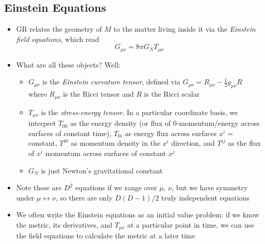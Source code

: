 \documentclass[12pt,a4paper]{article}
\numberwithin{equation}{section}
\begin{document}
	\subsection{Einstein Equations}
	\begin{itemize}
		\item GR relates the geometry of $M$ to the matter living inside it via the \textit{Einstein field equations}, which read
		\begin{equation}
			G_{\mu\nu}=8\pi G_{N}T_{\mu\nu}
		\end{equation}
		\item What are all these objects? Well:
		\begin{itemize}
			\item $G_{\mu\nu}$ is the \textit{Einstein curvature tensor}, defined via $G_{\mu\nu}=R_{\mu\nu}-\frac{1}{2}g_{\mu\nu}R$ where $R_{\mu\nu}$ is the Ricci tensor and $R$ is the Ricci scalar
			\item $T_{\mu\nu}$ is the \textit{stress-energy tensor}. In a particular coordinate basis, we interpret $T_{00}$ as the energy density (or flux of 0-momentum/energy across surfaces of constant time), $T_{0i}$ as energy flux across surfaces $x^{i}=$ constant, $T^{i0}$ as momentum density in the $x^{i}$ direction, and $T^{ij}$ as the flux of $x^{i}$ momentum across surfaces of constant $x^{j}$
			\item $G_{N}$ is just Newton's gravitational constant
		\end{itemize}
		\item Note these are $D^{2}$ equations if we range over $\mu,\,\nu$, but we have symmetry under $\mu\leftrightarrow\nu$, so there are only $D(D-1)/2$ truly independent equations
		\item We often write the Einstein equations as an initial value problem: if we know the metric, its derivatives, and $T_{\mu\nu}$ at a particular point in time, we can use the field equations to calculate the metric at a later time
	\end{itemize}
\end{document}
